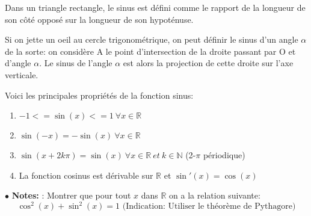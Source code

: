 \documentclass[a4paper]{article}
\theoremstyle{break}
\newcommand{\R}{\mathbb{R}}
\newcommand{\note}{$\bullet$ \textbf{Notes: }}
\begin{document}
Dans un triangle rectangle, le sinus est défini comme le rapport de la
longueur de son côté opposé sur la longueur de son hypoténuse. 

Si on jette un oeil au cercle trigonométrique, on peut définir le sinus d'un
angle $\alpha$ de la sorte: on considère A le point d'intersection de la droite
passant par O et d'angle $\alpha$. Le sinus de l'angle $\alpha$ est alors
la projection de cette droite sur l'axe verticale.

Voici les principales propriétés de la fonction sinus:
\begin{enumerate}[label=(\alph*), leftmargin =2cm]
\item $-1 <= \sin(x) <= 1 ~ \forall x \in \R$
\item $\sin(-x) = -\sin(x) ~ \forall x \in \R$
\item $\sin(x+2k\pi) = \sin(x) ~ \forall x \in \R ~ et ~k \in \mathbb{N}$
  (2-$\pi$ périodique)
\item La fonction cosinus est dérivable sur $\R$ et $\sin'(x) = \cos(x)$
\end{enumerate}

\note: Montrer que pour tout $x$ dans $\R$ on a la relation suivante:
\[
  \cos^2(x) + \sin^2(x) = 1 \text{ (Indication: Utiliser le théorème de Pythagore)}
\]


\end{document}
